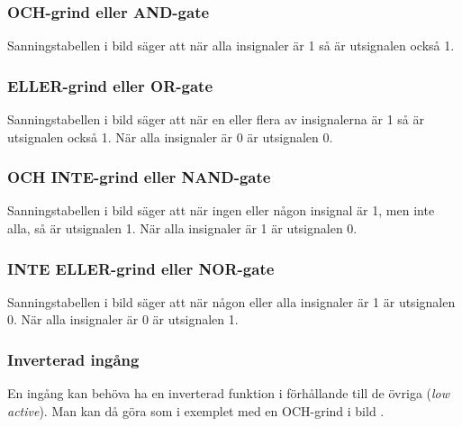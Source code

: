 \subsubsection{OCH-grind eller AND-gate}

Sanningstabellen i bild  säger att när alla insignaler
är 1 så är utsignalen också 1.

\subsubsection{ELLER-grind eller OR-gate}


Sanningstabellen i bild  säger att när en eller flera av
insignalerna är 1 så är utsignalen också 1.
När alla insignaler är 0 är utsignalen 0.

\subsubsection{OCH INTE-grind eller NAND-gate}


Sanningstabellen i bild  säger att när ingen eller någon
insignal är 1, men inte alla, så är utsignalen 1.
När alla insignaler är 1 är utsignalen 0.

\subsubsection{INTE ELLER-grind eller NOR-gate}


Sanningstabellen i bild  säger att när någon eller alla
insignaler är 1 är utsignalen 0.
När alla insignaler är 0 är utsignalen 1.

\subsubsection{Inverterad ingång}

En ingång kan behöva ha en inverterad funktion i förhållande till de övriga
(\emph{low active}).
Man kan då göra som i exemplet med en OCH-grind i bild .


